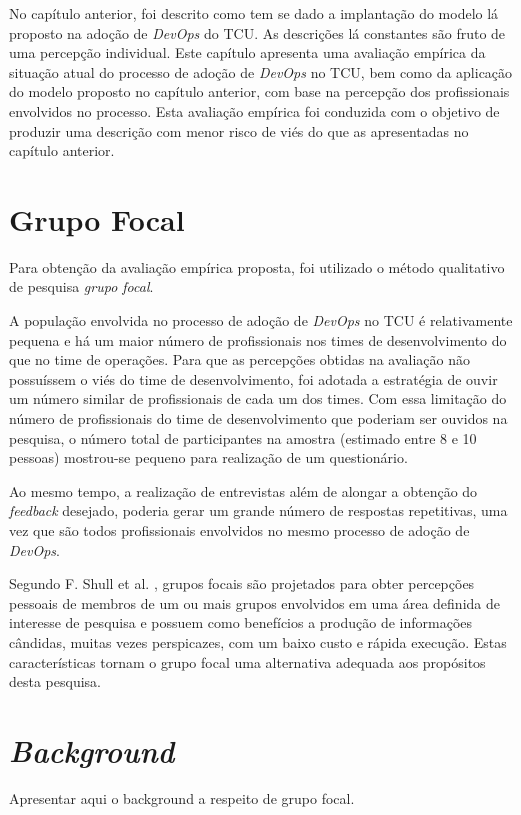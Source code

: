 No capítulo anterior, foi descrito como tem se dado a implantação do modelo
lá proposto na adoção de \textit{DevOps} do TCU. As descrições lá constantes
são fruto de uma percepção individual. Este capítulo apresenta uma avaliação
empírica da situação atual do processo de adoção de \textit{DevOps} no \acrshort{TCU},
bem como da aplicação do modelo proposto no capítulo anterior, com base na
percepção dos profissionais envolvidos no processo. Esta avaliação empírica
foi conduzida com o objetivo de produzir uma descrição com menor risco de viés
do que as apresentadas no capítulo anterior.

\section{Grupo Focal}

Para obtenção da avaliação empírica proposta, foi utilizado o método qualitativo
de pesquisa \emph{grupo focal}.

A população envolvida no processo de adoção de \textit{DevOps} no TCU é
relativamente pequena e há um maior número de profissionais nos times de
desenvolvimento do que no time de operações. Para que as percepções obtidas
na avaliação não possuíssem o viés do time de desenvolvimento, foi adotada a
estratégia de ouvir um número similar de profissionais de cada um dos times.
Com essa limitação do número de profissionais do time de desenvolvimento que
poderiam ser ouvidos na pesquisa, o número total de participantes na amostra
(estimado entre 8 e 10 pessoas) mostrou-se pequeno para realização de um
questionário.

Ao mesmo tempo, a realização de entrevistas além de alongar a obtenção do
\textit{feedback} desejado, poderia gerar um grande número de respostas repetitivas, uma
vez que são todos profissionais envolvidos no mesmo processo de adoção de
\textit{DevOps}.

Segundo F. Shull et al. \cite{shull2007guide}, grupos focais são projetados
para obter percepções pessoais de membros de um ou mais grupos envolvidos em
uma área definida de interesse de pesquisa e possuem como benefícios a produção
de informações cândidas, muitas vezes perspicazes, com um baixo custo e rápida
execução. Estas características tornam o grupo focal uma alternativa adequada
aos propósitos desta pesquisa.

\section{\textit{Background}}
Apresentar aqui o background a respeito de grupo focal.

